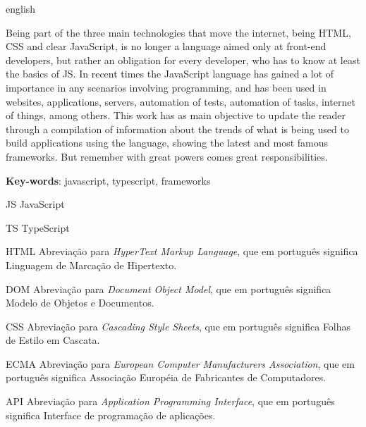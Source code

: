\documentclass[
	12pt,				%
	openright,			%
	twoside,			%
	a4paper,			%
	english,			%
	brazil				%
	]{abntex2}
\begin{document}
\begin{resumo}[Abstract]
 \begin{otherlanguage*}{english}

Being part of the three main technologies that move the internet, being HTML, CSS and clear JavaScript, is no longer a language aimed only at front-end developers, but rather an obligation for every developer, who has to know at least the basics of JS. In recent times the JavaScript language has gained a lot of importance in any scenarios involving programming, and has been used in websites, applications, servers, automation of tests, automation of tasks, internet of things, among others. This work has as main objective to update the reader through a compilation of information about the trends of what is being used to build applications using the language, showing the latest and most famous frameworks. But remember with great powers comes great responsibilities.

   \vspace{\onelineskip}
 
   \noindent 
   \textbf{Key-words}: javascript, typescript, frameworks
 \end{otherlanguage*}
\end{resumo}
\listoffigures*
\cleardoublepage


\begin{siglas}
  \item[JS] JavaScript
  \item[TS] TypeScript
  \item[HTML] Abreviação para \textit{HyperText Markup Language}, que em português significa Linguagem de Marcação de Hipertexto.
  \item[DOM] Abreviação para \textit{Document Object Model}, que em português significa Modelo de Objetos e Documentos.
  \item[CSS] Abreviação para \textit{Cascading Style Sheets}, que em português significa Folhas de Estilo em Cascata.
  \item[ECMA] Abreviação para \textit{European Computer Manufacturers Association}, que em português significa Associação Européia de Fabricantes de Computadores.
  \item[API] Abreviação para \textit{Application Programming Interface}, que em português significa Interface de programação de aplicações.
\end{siglas}
\end{document}

